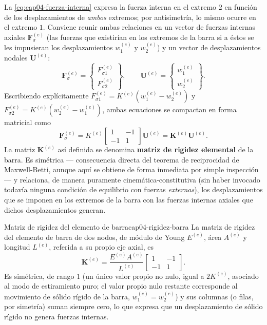 La \cref{eq:cap04-fuerza-interna} expresa la fuerza interna en el extremo $2$ en función de los desplazamientos de \emph{ambos} extremos; por antisimetría, lo mismo ocurre en el extremo $1$. Conviene reunir ambas relaciones en un vector de fuerzas internas axiales $\mathbf{F}_\sigma^{(e)}$ (las fuerzas que existirían en los extremos de la barra si a éstos se les impusieran los desplazamientos $w_1^{(e)}$ y $w_2^{(e)}$) y un vector de desplazamientos nodales $\mathbf{U}^{(e)}$:
\begin{equation}
\mathbf{F}_\sigma^{(e)} = \begin{Bmatrix} F_{\sigma 1}^{(e)} \\ F_{\sigma 2}^{(e)} \end{Bmatrix}, \qquad
\mathbf{U}^{(e)} = \begin{Bmatrix} w_1^{(e)} \\ w_2^{(e)} \end{Bmatrix} .
\end{equation}
Escribiendo explícitamente $F_{\sigma 1}^{(e)} = K^{(e)}(w_1^{(e)}-w_2^{(e)})$ y $F_{\sigma 2}^{(e)} = K^{(e)}(w_2^{(e)}-w_1^{(e)})$, ambas ecuaciones se compactan en forma matricial como
\[
\mathbf{F}_\sigma^{(e)} = K^{(e)} \begin{bmatrix} 1 & -1 \\ -1 & 1 \end{bmatrix} \mathbf{U}^{(e)} = \mathbf{K}^{(e)} \mathbf{U}^{(e)} .
\]
La matriz $\mathbf{K}^{(e)}$ así definida se denomina \textbf{matriz de rigidez elemental} de la barra. Es simétrica --- consecuencia directa del teorema de reciprocidad de Maxwell-Betti, aunque aquí se obtiene de forma inmediata por simple inspección --- y relaciona, de manera puramente cinemática-constitutiva (sin haber invocado todavía ninguna condición de equilibrio con fuerzas \emph{externas}), los desplazamientos que se imponen en los extremos de la barra con las fuerzas internas axiales que dichos desplazamientos generan.

\begin{ecnimportante}{Matriz de rigidez del elemento de barra}{cap04-rigidez-barra}
La matriz de rigidez del elemento de barra de dos nodos, de módulo de Young $E^{(e)}$, área $A^{(e)}$ y longitud $L^{(e)}$, referida a su propio eje axial, es
\[
\mathbf{K}^{(e)} = \frac{E^{(e)}A^{(e)}}{L^{(e)}} \begin{bmatrix} 1 & -1 \\ -1 & 1 \end{bmatrix} .
\]
Es simétrica, de rango $1$ (un único valor propio no nulo, igual a $2K^{(e)}$, asociado al modo de estiramiento puro; el valor propio nulo restante corresponde al movimiento de sólido rígido de la barra, $w_1^{(e)}=w_2^{(e)}$) y sus columnas (o filas, por simetría) suman siempre cero, lo que expresa que un desplazamiento de sólido rígido no genera fuerzas internas.
\end{ecnimportante}

